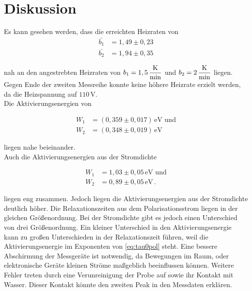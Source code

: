 \section{Diskussion}
\label{sec:Diskussion}

Es kann gesehen werden, dass die erreichten Heizraten von 
\begin{align*}
    \bar{b_1} &=   1,49 \pm  0,23 \\
    \bar{b_2} &=   1,94 \pm  0,35  
\end{align*}

nah an den angestrebten Heizraten von $ b_1 = 1,5 \, \unit{\dfrac{\kelvin}{\minute}}$ 
und $ b_2 = 2 \, \unit{\dfrac{\kelvin}{\minute}}$ liegen.
Gegen Ende der zweiten Messreihe konnte keine höhere Heizrate erzielt werden, da die Heizspannung auf $110 \,\si{\volt}$. \\
Die Aktivierungsenergien von 

\begin{align*}
W_1 &=   (0,359 \pm 0,017) \, \unit{\electronvolt} \, \, \text{und}  \\
W_2 &=   (0,348 \pm 0,019) \, \unit{\electronvolt}
\end{align*} 

liegen nahe beieinander. \\
Auch die Aktivierungsenergien aus der Stromdichte

\begin{align*}
    W_1 &= 1,03 \pm 0,05 \, \unit{\electronvolt}  \, \,  \text{und} \\
    W_2 &= 0,89 \pm 0,05 \, \unit{\electronvolt}    \,.
\end{align*}

liegen eng zusammen. Jedoch liegen die Aktivierungsenergien aus der Stromdichte deutlich höher.
Die Relaxationszeiten aus dem Polarisationsstrom liegen in der gleichen Größenordnung.
Bei der Stromdichte gibt es jedoch einen Unterschied von drei Größenordnung.
Ein kleiner Unterschied in den Aktivierungsenergie kann zu großen Unterschieden in der Relaxationszeit führen, weil 
die Aktivierungsenergie im Exponenten von \autoref{eq:tau0pol} steht.
Eine bessere Abschirmung der Messgeräte ist notwendig, da Bewegungen im Raum, 
oder elektronische Geräte kleinen Ströme maßgeblich beeinflussen können.
Weitere Fehler treten durch eine Verunreinigung der Probe auf sowie ihr Kontakt mit Wasser.
Dieser Kontakt könnte den zweiten Peak in den Messdaten erklären.
